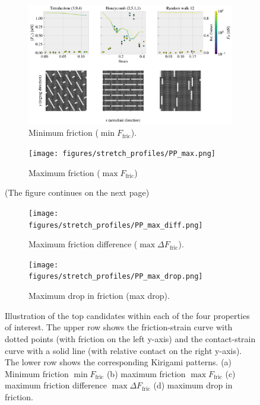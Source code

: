 \begin{figure}[H]
  \centering
  \begin{subfigure}[t]{1\textwidth}
      \centering
      \includegraphics[width=\linewidth]{figures/stretch_profiles/PP_min.pdf}
      \caption{Minimum friction ($\min F_{\text{fric}}$).}
      \label{fig:PP_min}
  \end{subfigure}
  \hfill
  \vspace{1cmm}
  \begin{subfigure}[t]{1\textwidth}
      \centering
      \texttt{[image: figures/stretch\_profiles/PP\_max.png]}
      \caption{Maximum friction ($\max F_{\text{fric}}$)}
      \label{fig:PP_max}
  \end{subfigure}
  \hfill
  \caption{(The figure continues on the next page)}
\end{figure}

\begin{figure}[H]\ContinuedFloat
  \centering
  \begin{subfigure}[t]{1\textwidth}
      \centering
      \texttt{[image: figures/stretch\_profiles/PP\_max\_diff.png]}
      \caption{Maximum friction difference ($\max \Delta F_{\text{fric}}$).}
      \label{fig:PP_max_diff}
  \end{subfigure}
  \hfill
  \vspace{1cmm}
  \begin{subfigure}[t]{1\textwidth}
      \centering
      \texttt{[image: figures/stretch\_profiles/PP\_max\_drop.png]}
      \caption{Maximum drop in friction (max drop).}
      \label{fig:PP_max_drop}
  \end{subfigure}
  \hfill
  \caption{Illustration of the top candidates within each of the four properties of interest. The upper row shows the friction-strain curve with dotted points (with friction on the left y-axis) and the contact-strain curve with a solid line (with relative contact on the right y-axis). The lower row shows the corresponding Kirigami patterns. (a) Minimum friction $\min F_{\text{fric}}$ (b) maximum friction $\max F_{\text{fric}}$ (c) maximum friction difference $\max \Delta F_{\text{fric}}$  (d) maximum drop in friction. }
  \label{fig:PP}
\end{figure}


